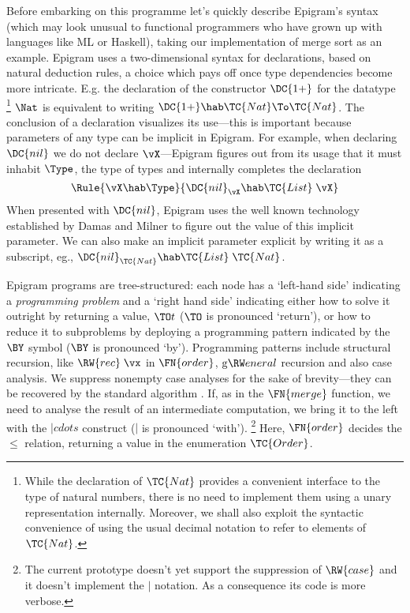 \documentclass{fundam}
\begin{document}
Before embarking on this programme let's quickly describe Epigram's
syntax (which may look unusual to functional programmers who have
grown up with languages like ML or Haskell), taking our
implementation of merge sort as an example.  Epigram uses a
two-dimensional syntax for declarations, based on natural deduction
rules, a choice which pays off once type
dependencies become more intricate.  E.g. the declaration of the constructor
$\DC{1+}$ for the datatype%
\footnote{While the declaration of $\TC{Nat}$ provides a convenient interface to the
type of natural numbers, there is no need to implement them using
a unary representation internally. Moreover, we shall also exploit the
syntactic
convenience of using the usual decimal notation to refer to elements of $\TC{Nat}$.}
$\Nat$ is equivalent to writing
$\DC{1+}\hab \TC{Nat}\To\TC{Nat}$.
The conclusion of a declaration visualizes its use---this is important
because parameters of any type can be implicit in Epigram. For example,
when declaring $\DC{nil}$ we do not declare $\vX$---Epigram figures out
from its usage that it must inhabit $\Type$, the type of types and internally
completes the declaration
\[ 
\Rule{\vX\hab\Type} {\DC{nil}_{\vX} \hab\TC{List}\;\vX}
\]
When presented with
$\DC{nil}$, Epigram uses the well known technology established by
Damas and Milner \cite{damas.milner:principal} to figure out the value
of this implicit parameter.  We can also make an implicit parameter
explicit by writing it as a subscript, eg., 
$\DC{nil}_{\TC{Nat}} \hab\TC{List}\;\TC{Nat}$.

Epigram programs are tree-structured: each node has a `left-hand side'
indicating a \emph{programming problem} and a `right hand side'
indicating either how to solve it outright by returning a value, $\TO
t$ ($\TO$ is pronounced `return'), or how to reduce it to subproblems
by deploying a programming
pattern indicated by the $\BY$ symbol ($\BY$ is pronounced `by').
Programming patterns include
structural recursion, like $\RW{rec}\;\vx$ in $\FN{order}$, $\general$
recursion and also case analysis. We suppress nonempty case analyses
for the sake of brevity---they can be recovered by the standard algorithm
\cite{augustsson:compiling.patterns}. If, as in the
$\FN{merge}$ function, we need to analyse the result of an
intermediate computation, we bring it to the left with the $|cdots$
construct ($|$ is pronounced `with').%
 \footnote{The current prototype doesn't yet support
  the suppression of $\RW{case}$ and it doesn't implement the $|$ notation.
  As a consequence its code is more verbose.} 
Here, $\FN{order}$ decides the
$\leq$ relation, returning a value in the enumeration $\TC{Order}$.
\end{document}
